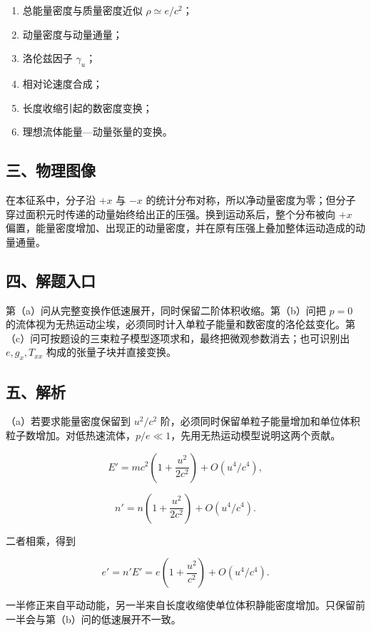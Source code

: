 \documentclass[12pt,a4paper,UTF8]{ctexart}
\newcommand{\tightlist}{\setlength{\itemsep}{0pt}\setlength{\parskip}{0pt}}
\begin{document}
\begin{enumerate}
\def\labelenumi{\arabic{enumi}.}
\tightlist
\item
  总能量密度与质量密度近似 \(\rho\simeq e/c^2\)；
\item
  动量密度与动量通量；
\item
  洛伦兹因子 \(\gamma_u\)；
\item
  相对论速度合成；
\item
  长度收缩引起的数密度变换；
\item
  理想流体能量---动量张量的变换。
\end{enumerate}

\subsection{三、物理图像}\label{ux4e09ux7269ux7406ux56feux50cf-7}

在本征系中，分子沿 \(+x\) 与 \(-x\)
的统计分布对称，所以净动量密度为零；但分子穿过面积元时传递的动量始终给出正的压强。换到运动系后，整个分布被向
\(+x\)
偏置，能量密度增加、出现正的动量密度，并在原有压强上叠加整体运动造成的动量通量。

\subsection{四、解题入口}\label{ux56dbux89e3ux9898ux5165ux53e3-7}

第（a）问从完整变换作低速展开，同时保留二阶体积收缩。第（b）问把 \(p=0\)
的流体视为无热运动尘埃，必须同时计入单粒子能量和数密度的洛伦兹变化。第（c）问可按题设的三束粒子模型逐项求和，最终把微观参数消去；也可识别出
\(e,g_x,T_{xx}\) 构成的张量子块并直接变换。

\subsection{五、解析}\label{ux4e94ux89e3ux6790-7}

（a）若要求能量密度保留到 \(u^2/c^2\)
阶，必须同时保留单粒子能量增加和单位体积粒子数增加。对低热速流体，\(p/e\ll1\)，先用无热运动模型说明这两个贡献。

\[E'=mc^2\left(1+\frac{u^2}{2c^2}\right)+O(u^4/c^4),\tag{1}\]

\[n'=n\left(1+\frac{u^2}{2c^2}\right)+O(u^4/c^4).\tag{2}\]

二者相乘，得到

\[e'=n'E'=e\left(1+\frac{u^2}{c^2}\right)+O(u^4/c^4).\tag{3}\]

一半修正来自平动动能，另一半来自长度收缩使单位体积静能密度增加。只保留前一半会与第（b）问的低速展开不一致。
\end{document}

